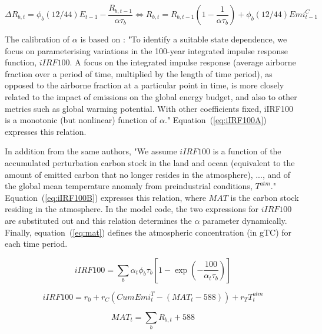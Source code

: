 \begin{equation}
\label{eq:r1}
\Delta \mathit{R}_{b,t} = \phi_b (12/44) E_{t-1} - \displaystyle \frac {\mathit{R}_{b,t-1}}{\alpha \tau_b} \iff \mathit{R}_{b,t} = \mathit{R}_{b,t-1} \left(\displaystyle 1 -\frac {1}{\alpha \tau_b} \right) + \phi_b (12/44) \mathit{Emi}^C_{t-1}
\end{equation}

The calibration of $\alpha$ is based
on \cite{MillaretalACP2017}:
"To identify a suitable state dependence, we focus on parameterising
variations in the 100-year integrated impulse response
function, $\mathit{iIRF100}$. A focus on the integrated impulse
response (average airborne fraction over a period of time,
multiplied by the length of time period), as opposed to the
airborne fraction at a particular point in time, is more closely
related to the impact of \COT{} emissions on the global energy
budget, and also to other metrics such as global warming potential.
With other coefficients fixed, iIRF100 is a monotonic
(but nonlinear) function of $\alpha$." 
Equation~(\ref{eq:iIRF100A}) expresses this relation.

In addition from the same
authors, "We assume $\mathit{iIRF100}$ is a function of the accumulated
perturbation carbon stock in the land and ocean (equivalent
to the amount of emitted carbon that no longer resides in
the atmosphere), ..., and of the global
mean temperature anomaly from preindustrial conditions, $T^{\mathit{atm}}$."
Equation~(\ref{eq:iIRF100B}) expresses this relation,
where $\mathit{MAT}$ is the carbon stock residing in the atmosphere.
In the model code, the two expressions for $\mathit{iIRF100}$
are substituted out and this relation determines the $\alpha$ parameter
dynamically. Finally, equation~({\ref{eq:mat}}) defines the atmospheric concentration (in gTC)
for each time period.

\begin{equation}
\label{eq:iIRF100A}
\mathit{iIRF100} = \displaystyle \sum_b{\alpha_t \phi_b \tau_b \left[
1 - \exp\left( -\frac{100}{\alpha_t \tau_b}\right)\right] }
\end{equation}

\begin{equation}
\label{eq:iIRF100B}
\mathit{iIRF100} = r_0 + r_C\left(\mathit{CumEmi}^T_t - (\mathit{MAT}_t - 588)\right)
+ r_T T^{\mathit{atm}}_t
\end{equation}

\begin{equation}
\label{eq:mat}
\mathit{MAT}_{t} = \sum_b{\mathit{R}_{b,t}} + 588
\end{equation}

